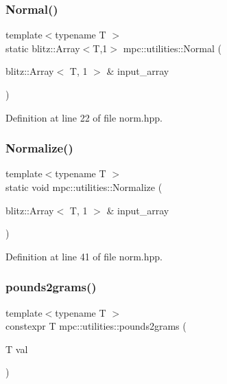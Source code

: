 \subsubsection{\texorpdfstring{Normal()}{Normal()}}
{\footnotesize\ttfamily template$<$typename T $>$ \\
static blitz\+::\+Array$<$T,1$>$ mpc\+::utilities\+::\+Normal (\begin{DoxyParamCaption}\item[{blitz\+::\+Array$<$ T, 1 $>$ \&}]{input\+\_\+array }\end{DoxyParamCaption})\hspace{0.3cm}{\ttfamily [static]}}



Definition at line 22 of file norm.\+hpp.

\mbox{\label{namespacempc_1_1utilities_a2b888b4e5d7d4fe16a1c97c120d0494f}} 
\subsubsection{\texorpdfstring{Normalize()}{Normalize()}}
{\footnotesize\ttfamily template$<$typename T $>$ \\
static void mpc\+::utilities\+::\+Normalize (\begin{DoxyParamCaption}\item[{blitz\+::\+Array$<$ T, 1 $>$ \&}]{input\+\_\+array }\end{DoxyParamCaption})\hspace{0.3cm}{\ttfamily [static]}}



Definition at line 41 of file norm.\+hpp.

\mbox{\label{namespacempc_1_1utilities_acf64151746ffeb74a8a8889d9c4dfd1e}} 
\subsubsection{\texorpdfstring{pounds2grams()}{pounds2grams()}}
{\footnotesize\ttfamily template$<$typename T $>$ \\
constexpr T mpc\+::utilities\+::pounds2grams (\begin{DoxyParamCaption}\item[{T}]{val }\end{DoxyParamCaption})}



